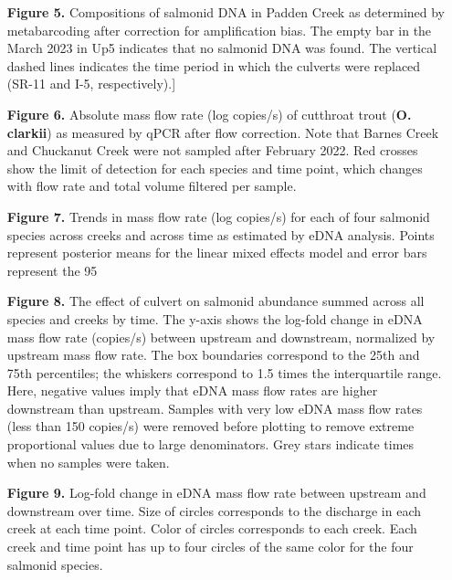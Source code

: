 \documentclass[
]{article}
\begin{document}
\begin{itemize}
\item[\textbf{Figure 5.}] Compositions of salmonid DNA in Padden Creek as determined by metabarcoding after correction for amplification bias. The empty bar in the March 2023 in Up5 indicates that no salmonid DNA was found. The vertical dashed lines indicates the time period in which the culverts were replaced (SR-11 and I-5, respectively).]
\item[\textbf{Figure 6.}] Absolute mass flow rate (log copies/s) of cutthroat trout (\textbf{O. clarkii}) as measured by qPCR after flow correction. Note that Barnes Creek and Chuckanut Creek were not sampled after February 2022. Red crosses show the limit of detection for each species and time point, which changes with flow rate and total volume filtered per sample.
\item[\textbf{Figure 7.}] Trends in mass flow rate (log copies/s) for each of four salmonid species across creeks and across time as estimated by eDNA analysis. Points represent posterior means for the linear mixed effects model and error bars represent the 95%
\item[\textbf{Figure 8.}] The effect of culvert on salmonid abundance summed across all species and creeks by time. The y-axis shows the log-fold change in eDNA mass flow rate (copies/s) between upstream and downstream, normalized by upstream mass flow rate. The box boundaries correspond to the 25th and 75th percentiles; the whiskers correspond to 1.5 times the interquartile range. Here, negative values imply that eDNA mass flow rates are higher downstream than upstream. Samples with very low eDNA mass flow rates (less than 150 copies/s) were removed before plotting to remove extreme proportional values due to large denominators. Grey stars indicate times when no samples were taken.
\item[\textbf{Figure 9.}] Log-fold change in eDNA mass flow rate between upstream and downstream over time. Size of circles corresponds to the discharge in each creek at each time point. Color of circles corresponds to each creek. Each creek and time point has up to four circles of the same color for the four salmonid species.

\end{itemize}
\end{document}
